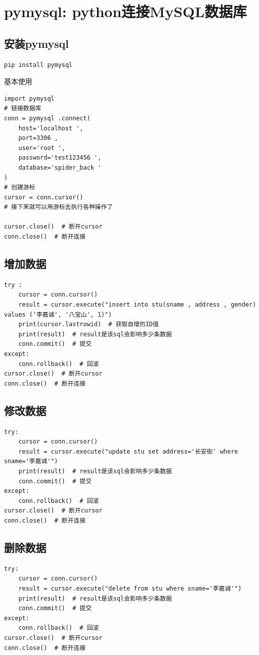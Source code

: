 \chapter{pymysql: python连接MySQL数据库}
\section{安装pymysql}

\begin{lstlisting}[style=demostyle,numbers=none]
pip install pymysql
\end{lstlisting}

基本使用
\begin{lstlisting}[style=demostyle,numbers=none]
import pymysql
# 链接数据库
conn = pymysql .connect(
    host='localhost ', 
    port=3306 ,
    user='root ', 
    password='test123456 ', 
    database='spider_back '
)
# 创建游标
cursor = conn.cursor()
# 接下来就可以用游标去执行各种操作了

cursor.close()  # 断开cursor 
conn.close()  # 断开连接
\end{lstlisting}

\section{增加数据}
\begin{lstlisting}[style=demostyle,numbers=none]
try :
    cursor = conn.cursor()
    result = cursor.execute("insert into stu(sname , address , gender) values ('李嘉诚', '八宝山', 1)")
    print(cursor.lastrowid)  # 获取自增的ID值
    print(result)  # result是该sql会影响多少条数据
    conn.commit()  # 提交
except:
    conn.rollback()  # 回滚
cursor.close()  # 断开cursor
conn.close()  # 断开连接
\end{lstlisting}

\section{修改数据}
\begin{lstlisting}[style=demostyle,numbers=none]
try:
    cursor = conn.cursor()
    result = cursor.execute("update stu set address='长安街' where sname='李嘉诚'")
    print(result)  # result是该sql会影响多少条数据
    conn.commit()  # 提交
except:
    conn.rollback()  # 回滚
cursor.close()  # 断开cursor
conn.close()  # 断开连接
\end{lstlisting}

\section{删除数据}
\begin{lstlisting}[style=demostyle,numbers=none]
try:
    cursor = conn.cursor()
    result = cursor.execute("delete from stu where sname='李嘉诚'")
    print(result)  # result是该sql会影响多少条数据
    conn.commit()  # 提交
except:
    conn.rollback()  # 回滚
cursor.close()  # 断开cursor
conn.close()  # 断开连接
\end{lstlisting}

